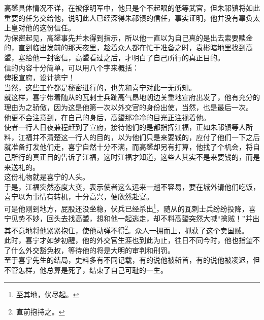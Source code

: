 \begin{multicols}{\theparacolNo}
高𨭉具体情况不详，在被俘明军中，他只是个不起眼的低等武官，但朱祁镇将如此重要的任务交给他，说明此人已经深得朱祁镇的信任，事实证明，他并没有辜负太上皇对他的这份信任。\\

为保密起见，高𨭉事先并未得到指示，所以他一直以为自己真的是出去索要赎金的，直到临出发前的那天夜里，趁着众人都在忙于准备之时，袁彬暗地里找到高𨭉，塞给他一封密信，高𨭉看过之后，才明白了自己所行的真正目的。\\

信的内容十分简单，可以用八个字来概括：\\

俾报宣府，设计擒宁！\\

当然，这些工作都是秘密进行的，也先和喜宁对此一无所知。\\

就这样，喜宁带着随从的瓦剌士兵趾高气昂地朝边关重地宣府出发了，他有充分的理由为之骄傲，因为这是他第一次以外交官的身份出使，当然，也是最后一次。\\

他更不会注意到，在自己的身后，高𨭉那冷冷的目光正注视着他。\\

使者一行人日夜兼程赶到了宣府，接待他们的是都指挥江福，正如朱祁镇等人所料，江福并不清楚这一行人的目的，以为他们只是来要钱的，应付了他们一下之后就准备打发他们走，喜宁自然十分不满，而高𨭉却另有打算，他找了个机会，将自己所行的真正目的告诉了江福，这时江福才知道，这些人其实不是来要钱的，而是来送礼的。\\

这份礼物就是喜宁的人头。\\

于是，江福突然态度大变，表示使者这么远来一趟不容易，要在城外请他们吃饭，喜宁以为事情有转机，十分高兴，便欣然赴宴。\\

可是他刚到地方，屁股还没坐稳，伏兵已经杀出\footnote{至其地，伏尽起。}，随从的瓦剌士兵纷纷投降，喜宁见势不妙，回头去找高𨭉，想和他一起逃走，却不料高𨭉突然大喊“擒贼！”并出其不意地将他紧紧抱住，使他动弹不得\footnote{直前抱持之。}。众人一拥而上，抓获了这个卖国贼。\\

此时，喜宁才如梦初醒，他的外交官生涯也到此为止，往日不同今时，他也指望不了什么外交豁免权，等待他的将是大明的审判和刑罚。\\

至于喜宁先生的结局，史料多有不同记载，有的说他被斩首，有的说他被凌迟，但不管怎样，他总算是死了，结束了自己可耻的一生。\\


\end{multicols}
